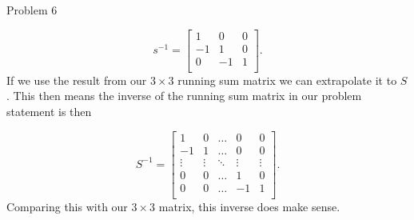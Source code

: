 \begin{problem}{Problem 6}
\begin{Highlight}[Solution]
        \begin{equation}
            s^{-1} = 
            \begin{bmatrix}
                1 & 0 & 0 \\
                -1 & 1 & 0 \\
                0 & -1 & 1 \\
            \end{bmatrix}.
        \end{equation}
        If we use the result from our $3 \times 3$ running sum matrix we can extrapolate it to $S$. This then means the inverse of the running sum matrix in our problem statement is then

        \begin{equation}
            S^{-1} = 
            \begin{bmatrix}
                1 & 0 & \dots & 0 & 0 \\
                -1 & 1 & \dots & 0 & 0 \\
                \vdots & \vdots & \ddots & \vdots & \vdots \\
                0 & 0 & \dots & 1 & 0 \\
                0 & 0 & \dots & -1 & 1 \\
            \end{bmatrix}.
        \end{equation}
        Comparing this with our $3 \times 3$ matrix, this inverse does make sense.
    \end{Highlight}
\end{problem}

